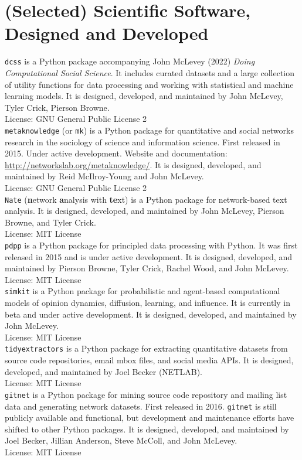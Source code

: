 \documentclass[11pt, a4paper]{article}
\newcommand{\note}[1]{\marginnote{\scriptsize #1}}
\begin{document}
\section*{(Selected) Scientific Software, Designed and Developed}
\noindent
  \note{\textbf{\texttt{dcss}}}\texttt{dcss} is a Python package
accompanying John McLevey (2022) \emph{Doing Computational Social
Science}. It includes curated datasets and a large collection of utility
functions for data processing and working with statistical and machine
learning models. It is designed, developed, and maintained by John
McLevey, Tyler Crick, Pierson Browne.\\
  License: GNU General Public License 2\\[.2cm]
  \note{\textbf{\texttt{mk}}}\texttt{metaknowledge} (or \texttt{mk}) is
a Python package for quantitative and social networks research in the
sociology of science and information science. First released in 2015.
Under active development. Website and documentation:
\url{http://networkslab.org/metaknowledge/}. It is designed, developed, and maintained by Reid
McIlroy-Young and John McLevey.\\
  License: GNU General Public License 2\\[.2cm]
  \note{\textbf{\texttt{Nate}}}\texttt{Nate} (\textbf{n}etwork
\textbf{a}nalysis with \textbf{te}xt) is a Python package for
network-based text
analysis. It is designed, developed, and maintained by John McLevey,
Pierson Browne, and Tyler Crick.\\
  License: MIT License\\[.2cm]
  \note{\textbf{\texttt{pdpp}}}\texttt{pdpp} is a Python package for
principled data processing with Python. It was first released in 2015
and is under active
development. It is designed, developed, and maintained by Pierson
Browne, Tyler Crick, Rachel Wood, and John McLevey.\\
  License: MIT License\\[.2cm]
  \note{\textbf{\texttt{simkit}}}\texttt{simkit} is a Python package for
probabilistic and agent-based computational models of opinion dynamics,
diffusion, learning, and influence. It is currently in beta and under
active development. It is designed, developed, and maintained by John
McLevey.\\
  License: MIT License\\[.2cm]
  \note{\textbf{\texttt{tidyext}}}\texttt{tidyextractors} is a Python
package for extracting quantitative datasets from source code
repositories, email mbox files, and social media
APIs. It is designed, developed, and maintained by Joel Becker
(NETLAB).\\
  License: MIT License\\[.2cm]
  \note{\textbf{\texttt{gitnet}}}\texttt{gitnet} is a Python package for
mining source code repository and mailing list data and generating
network datasets. First released in 2016. \texttt{gitnet} is still
publicly available and functional, but development and maintenance
efforts have shifted to other Python
packages. It is designed, developed, and maintained by Joel Becker,
Jillian Anderson, Steve McColl, and John McLevey.\\
  License: MIT License\\[.2cm]
\end{document}
